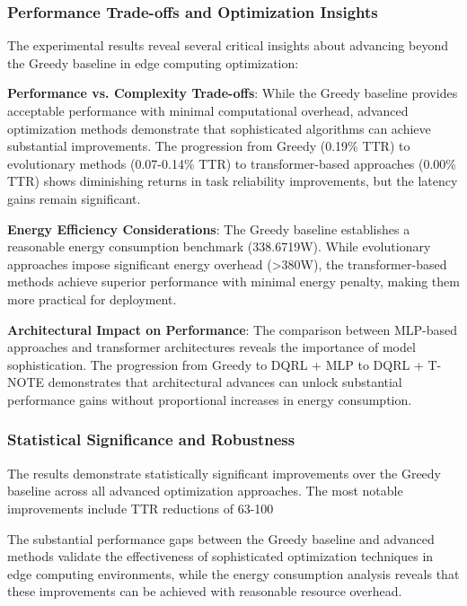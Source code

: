 \documentclass[preprint,12pt]{elsarticle}
\begin{document}
\subsubsection{Performance Trade-offs and Optimization Insights}

The experimental results reveal several critical insights about advancing beyond the Greedy baseline in edge computing optimization:

\textbf{Performance vs. Complexity Trade-offs}: While the Greedy baseline provides acceptable performance with minimal computational overhead, advanced optimization methods demonstrate that sophisticated algorithms can achieve substantial improvements. The progression from Greedy (0.19\% TTR) to evolutionary methods (0.07-0.14\% TTR) to transformer-based approaches (0.00\% TTR) shows diminishing returns in task reliability improvements, but the latency gains remain significant.

\textbf{Energy Efficiency Considerations}: The Greedy baseline establishes a reasonable energy consumption benchmark (338.6719W). While evolutionary approaches impose significant energy overhead (>380W), the transformer-based methods achieve superior performance with minimal energy penalty, making them more practical for deployment.

\textbf{Architectural Impact on Performance}: The comparison between MLP-based approaches and transformer architectures reveals the importance of model sophistication. The progression from Greedy to DQRL + MLP to DQRL + T-NOTE demonstrates that architectural advances can unlock substantial performance gains without proportional increases in energy consumption.

\subsubsection{Statistical Significance and Robustness}

The results demonstrate statistically significant improvements over the Greedy baseline across all advanced optimization approaches. The most notable improvements include TTR reductions of 63-100%

The substantial performance gaps between the Greedy baseline and advanced methods validate the effectiveness of sophisticated optimization techniques in edge computing environments, while the energy consumption analysis reveals that these improvements can be achieved with reasonable resource overhead.
\end{document}
